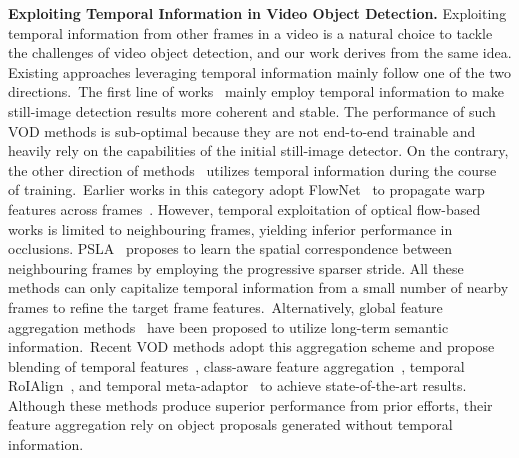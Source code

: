 \documentclass{bmvc2k}
\begin{document}
\vspace{3pt}
\noindent \textbf{Exploiting Temporal Information in Video Object Detection.}
\hspace{0.8pt}
\label{subsec:vide_object_detection}
Exploiting temporal information from other frames in a video is a natural choice to tackle the challenges of video object detection, and our work derives from the same idea. Existing approaches leveraging temporal information mainly follow one of the two directions.~The first line of works~\cite{han2016seq, kang2016object, kang2017object, sabater2020robust} mainly employ temporal information to make still-image detection results more coherent and stable. The performance of such VOD methods is sub-optimal because they are not end-to-end trainable and heavily rely on the capabilities of the initial still-image detector. On the contrary, the other direction of methods~\cite{zhu2017deep, zhu2017flow, feichtenhofer2017detect, wang2018fully, jiang2019video, wu2019sequence, han2020mining, gong2021temporal, han2021class, cui2021tf, hua2021temporal, han2020exploiting} utilizes temporal information during the course of training.~Earlier works in this category adopt FlowNet~\cite{dosovitskiy2015flownet} to propagate warp features across frames~\cite{zhu2017flow, wang2018fully, zhu2017deep, kang2017t}. However, temporal exploitation of optical flow-based works is limited to neighbouring frames, yielding inferior performance in occlusions. PSLA~\cite{guo2019progressive} proposes to learn the spatial correspondence between neighbouring frames by employing the progressive sparser stride. All these methods can only capitalize temporal information from a small number of nearby frames to refine the target frame features.~Alternatively, global feature aggregation methods~\cite{wu2019sequence, deng2019object, shvets2019leveraging} have been proposed to utilize long-term semantic information.~Recent VOD methods adopt this aggregation scheme and propose blending of temporal features~\cite{cui2021tf}, class-aware feature aggregation~\cite{han2021class, han2020exploiting}, temporal RoIAlign~\cite{gong2021temporal}, and temporal meta-adaptor~\cite{hua2021temporal} to achieve state-of-the-art results. Although these methods produce superior performance from prior efforts, their feature aggregation rely on object proposals generated without temporal information.
\end{document}
